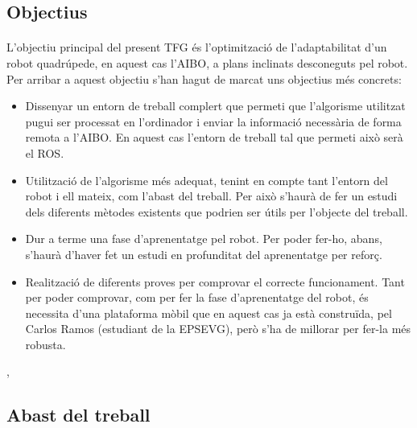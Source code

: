 \documentclass[12pt,a4paper,final,twoside]{article}
\begin{document}


\label{Objectius}
\subsection*{Objectius}

\paragraph{}L'objectiu principal del present TFG és l'optimització de l'adaptabilitat d'un robot quadrúpede, en aquest cas l'AIBO, a plans inclinats desconeguts pel robot. Per arribar a aquest objectiu s'han hagut de marcat uns objectius més concrets:
\begin{itemize}
\item Dissenyar un entorn de treball complert que permeti que l'algorisme utilitzat pugui ser processat en l'ordinador i enviar la informació necessària de forma remota a l'AIBO. En aquest cas l'entorn de treball tal que permeti això serà el ROS.
\item Utilització de l'algorisme més adequat, tenint en compte tant l'entorn del robot i ell mateix, com l'abast del treball. Per això s'haurà de fer un estudi dels diferents mètodes existents que podrien ser útils per l'objecte del treball.
\item Dur a terme una fase d'aprenentatge pel robot. Per poder fer-ho, abans, s'haurà d'haver fet un estudi en profunditat del aprenentatge per reforç.
\item Realització de diferents proves per comprovar el correcte funcionament. Tant per poder comprovar, com per fer la fase d'aprenentatge del robot, és necessita d'una plataforma mòbil que en aquest cas ja està construïda, pel Carlos Ramos (estudiant de la EPSEVG)\cite{TFG_Carlos_Ramos}, però s'ha de millorar per fer-la més robusta.
\end{itemize},


\label{Abast}
\subsection*{Abast del treball}
\end{document}
